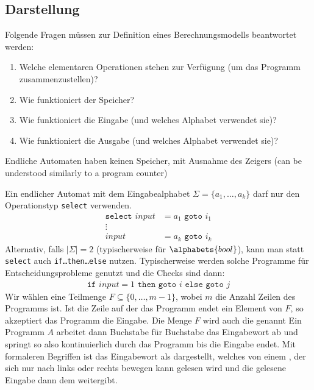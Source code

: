 \subsection{Darstellung}
Folgende Fragen müssen zur Definition eines Berechnungsmodells beantwortet werden:
\begin{enumerate}
    \item Welche elementaren Operationen stehen zur Verfügung (um das Programm zusammenzustellen)?
    \item Wie funktioniert der Speicher?
    \item Wie funktioniert die Eingabe (und welches Alphabet verwendet sie)?
    \item Wie funktioniert die Ausgabe (und welches Alphabet verwendet sie)?
\end{enumerate}
Endliche Automaten haben keinen Speicher, mit Ausnahme des Zeigers (can be understood similarly to a program counter)

Ein endlicher Automat mit dem Eingabealphabet $\Sigma = \{ a_1, \ldots, a_k \}$ darf nur den Operationstyp \texttt{select} verwenden.
\begin{align*}
    \texttt{select } input & = a_1 \texttt{ goto } i_1 \\[-0.2cm]
    \vdots                                             \\
    input                  & = a_k \texttt{ goto } i_k
\end{align*}
Alternativ, falls $|\Sigma| = 2$ (typischerweise für $\alphabets{bool}$), kann man statt \texttt{select} auch \texttt{if\dots then\dots else} nutzen.
Typischerweise werden solche Programme für Entscheidungsprobleme genutzt und die Checks sind dann:
\begin{align*}
    \texttt{if } input = 1 \texttt{ then goto } i \texttt{ else goto } j
\end{align*}
Wir wählen eine Teilmenge $F \subseteq \{ 0, \ldots, m - 1 \}$, wobei $m$ die Anzahl Zeilen des Programms ist.
Ist die Zeile auf der das Programm endet ein Element von $F$, so akzeptiert das Programm die Eingabe.
Die Menge $F$ wird auch die  genannt
%
Ein Programm $A$ arbeitet dann Buchstabe für Buchstabe das Eingabewort ab und springt so also kontinuierlich durch das Programm bis die Eingabe endet.
Mit formaleren Begriffen ist das Eingabewort als  dargestellt, welches von einem , der sich nur nach links oder rechts bewegen kann gelesen wird und die gelesene Eingabe dann dem  weitergibt.
